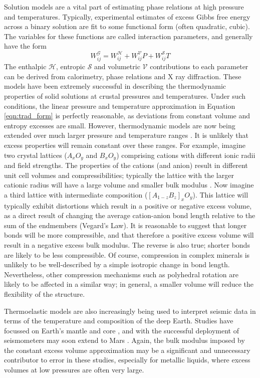 Solution models are a vital part of estimating phase relations at high pressure and temperatures. Typically, experimental estimates of excess Gibbs free energy across a binary solution are fit to some functional form (often quadratic, cubic). The variables for these functions are called interaction parameters, and generally have the form
\begin{equation}
  W_{ij}^{\mathcal{G}} = W_{ij}^{\mathcal{H}} + W_{ij}^{\mathcal{V}}P + W_{ij}^{\mathcal{S}}T
  \label{eqn:trad_form}
\end{equation}
\noindent The enthalpic $\mathcal{H}$, entropic $\mathcal{S}$ and volumetric $\mathcal{V}$ contributions to each parameter can be derived from calorimetry, phase relations and X ray diffraction. These models have been extremely successful in describing the thermodynamic properties of solid solutions at crustal pressures and temperatures. Under such conditions, the linear pressure and temperature approximation in Equation \ref{eqn:trad_form} is perfectly reasonable, as deviations from constant volume and entropy excesses are small. However, thermodynamic models are now being extended over much larger pressure and temperature ranges \citep{SLB2011, HP2011, HHPH2013, DKS2013}. It is unlikely that excess properties will remain constant over these ranges. For example, imagine two crystal lattices ($A_xO_y$ and $B_xO_y$) comprising cations with different ionic radii and field strengths. The properties of the cations (and anion) result in different unit cell volumes and compressibilities; typically the lattice with the larger cationic radius will have a large volume and smaller bulk modulus \citep{AA1970}. Now imagine a third lattice with intermediate composition ($[A_{1-z}B_z]_xO_y$). This lattice will typically exhibit distortions which result in a positive or negative excess volume, as a direct result of changing the average cation-anion bond length relative to the sum of the endmembers (Vegard's Law). It is reasonable to suggest that longer bonds will be more compressible, and that therefore a positive excess volume will result in a negative excess bulk modulus. The reverse is also true; shorter bonds are likely to be less compressible. Of course, compression in complex minerals is unlikely to be well-described by a simple isotropic change in bond length. Nevertheless, other compression mechanisms such as polyhedral rotation are likely to be affected in a similar way; in general, a smaller volume will reduce the flexibility of the structure.

Thermoelastic models are also increasingly being used to interpret seismic data in terms of the temperature and composition of the deep Earth. Studies have focussed on Earth's mantle \citep[e.g.][]{DGDSBR2012, MCDRT2012, DCT2012} and core \citep[e.g.][]{SGGFMM2000,SFGMM2004}, and with the successful deployment of seismometers may soon extend to Mars \citep{GLZR2014}. Again, the bulk modulus imposed by the constant excess volume approximation may be a significant and unnecessary contributor to error in these studies, especially for metallic liquids, where excess volumes at low pressures are often very large. 

